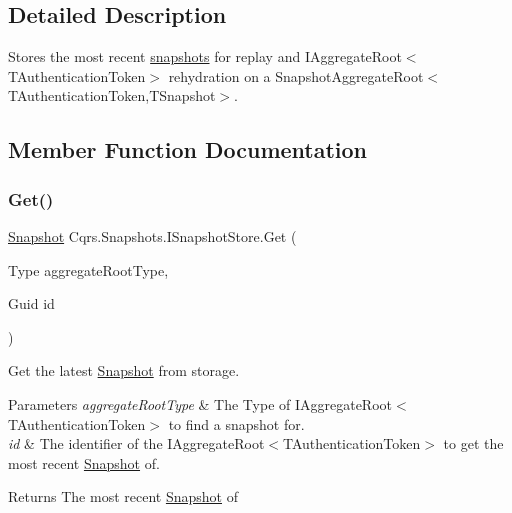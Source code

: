 \subsection{Detailed Description}
Stores the most recent \hyperlink{classCqrs_1_1Snapshots_1_1Snapshot}{snapshots} for replay and I\+Aggregate\+Root$<$\+T\+Authentication\+Token$>$ rehydration on a Snapshot\+Aggregate\+Root$<$\+T\+Authentication\+Token,\+T\+Snapshot$>$. 



\subsection{Member Function Documentation}
\mbox{\label{interfaceCqrs_1_1Snapshots_1_1ISnapshotStore_a25efb06a4a6fcc9246d4572777c95dd5_a25efb06a4a6fcc9246d4572777c95dd5}} 
\subsubsection{\texorpdfstring{Get()}{Get()}}
{\footnotesize\ttfamily \hyperlink{classCqrs_1_1Snapshots_1_1Snapshot}{Snapshot} Cqrs.\+Snapshots.\+I\+Snapshot\+Store.\+Get (\begin{DoxyParamCaption}\item[{Type}]{aggregate\+Root\+Type,  }\item[{Guid}]{id }\end{DoxyParamCaption})}



Get the latest \hyperlink{classCqrs_1_1Snapshots_1_1Snapshot}{Snapshot} from storage. 


\begin{DoxyParams}{Parameters}
{\em aggregate\+Root\+Type} & The Type of I\+Aggregate\+Root$<$\+T\+Authentication\+Token$>$ to find a snapshot for.\\
\hline
{\em id} & The identifier of the I\+Aggregate\+Root$<$\+T\+Authentication\+Token$>$ to get the most recent \hyperlink{classCqrs_1_1Snapshots_1_1Snapshot}{Snapshot} of.\\
\hline
\end{DoxyParams}
\begin{DoxyReturn}{Returns}
The most recent \hyperlink{classCqrs_1_1Snapshots_1_1Snapshot}{Snapshot} of
\end{DoxyReturn}


